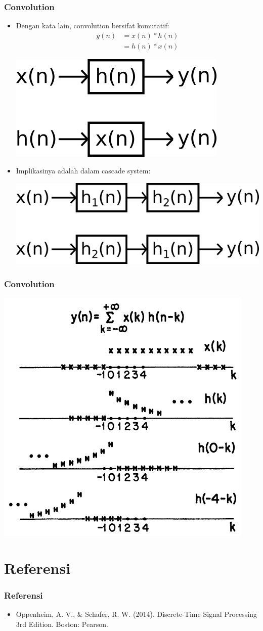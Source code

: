 \documentclass[pdflatex,compress]{beamer}
\begin{document}
\begin{frame}
	\frametitle{Convolution}
	\begin{itemize}
		\item Dengan kata lain, convolution bersifat komutatif:
		\begin{align*}
			y(n) &= x(n) * h(n) \\
			&= h(n) * x(n)
		\end{align*}
		\begin{center}
			\includegraphics[width=0.3\linewidth]{img/img014}
		\end{center}
		\item Implikasinya adalah dalam cascade system:
		\begin{center}
			\includegraphics[width=0.4\linewidth]{img/img015}
		\end{center}
	\end{itemize}
\end{frame}

\begin{frame}
	\frametitle{Convolution}
	\begin{center}
		\includegraphics[height=0.8\textheight]{img/img016}
	\end{center}
\end{frame}

\section{Referensi}

\begin{frame}
	\frametitle{Referensi}
	\begin{itemize}
		\item Oppenheim, A. V., \& Schafer, R. W. (2014). Discrete-Time Signal Processing 3rd Edition. Boston: Pearson.
	\end{itemize}
\end{frame}
\end{document}
